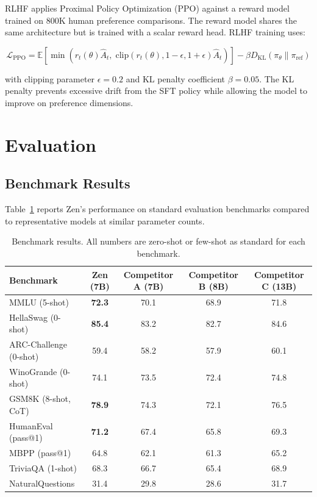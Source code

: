 \documentclass[11pt,a4paper]{article}
\begin{document}
RLHF applies Proximal Policy Optimization (PPO) \cite{schulman2017ppo} against a reward model
trained on 800K human preference comparisons. The reward model shares the same architecture but
is trained with a scalar reward head. RLHF training uses:

\begin{equation}
  \mathcal{L}_{\text{PPO}} = \mathbb{E}\!\left[\min\!\left(r_t(\theta)\hat{A}_t,\;
  \text{clip}(r_t(\theta), 1-\epsilon, 1+\epsilon)\hat{A}_t\right)\right] - \beta D_{\text{KL}}(\pi_\theta \| \pi_{\text{ref}})
\end{equation}

with clipping parameter $\epsilon = 0.2$ and KL penalty coefficient $\beta = 0.05$. The KL
penalty prevents excessive drift from the SFT policy while allowing the model to improve on
preference dimensions.

\section{Evaluation}

\subsection{Benchmark Results}

Table~\ref{tab:benchmarks} reports Zen's performance on standard evaluation benchmarks compared
to representative models at similar parameter counts.

\begin{table}[H]
\centering
\caption{Benchmark results. All numbers are zero-shot or few-shot as standard for each benchmark.}
\label{tab:benchmarks}
\begin{tabular}{lcccc}
\toprule
\textbf{Benchmark} & \textbf{Zen (7B)} & \textbf{Competitor A (7B)} & \textbf{Competitor B (8B)} & \textbf{Competitor C (13B)} \\
\midrule
MMLU (5-shot)         & \textbf{72.3} & 70.1 & 68.9 & 71.8 \\
HellaSwag (0-shot)    & \textbf{85.4} & 83.2 & 82.7 & 84.6 \\
ARC-Challenge (0-shot)& 59.4          & 58.2 & 57.9 & 60.1 \\
WinoGrande (0-shot)   & 74.1          & 73.5 & 72.4 & 74.8 \\
GSM8K (8-shot, CoT)   & \textbf{78.9} & 74.3 & 72.1 & 76.5 \\
HumanEval (pass@1)    & \textbf{71.2} & 67.4 & 65.8 & 69.3 \\
MBPP (pass@1)         & 64.8          & 62.1 & 61.3 & 65.2 \\
TriviaQA (1-shot)     & 68.3          & 66.7 & 65.4 & 68.9 \\
NaturalQuestions      & 31.4          & 29.8 & 28.6 & 31.7 \\
\bottomrule
\end{tabular}
\end{table}
\end{document}
